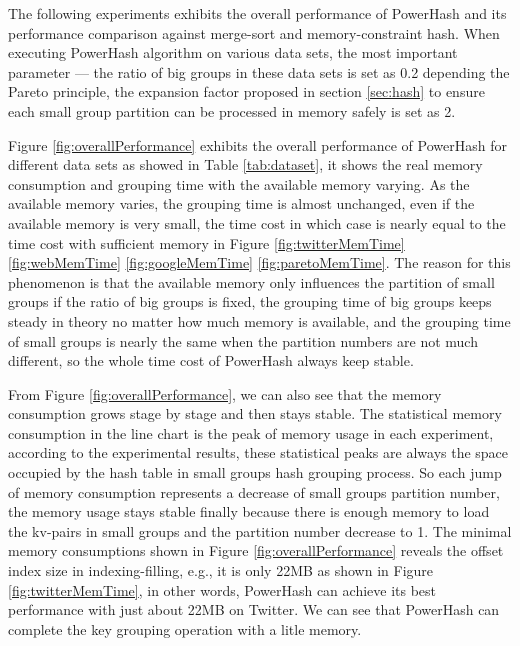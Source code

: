 The following experiments exhibits the overall performance of PowerHash and its performance comparison against merge-sort and memory-constraint hash. When executing PowerHash algorithm on various data sets, the most important parameter --- the ratio of big groups in these data sets is set as 0.2 depending the Pareto principle, the expansion factor proposed in section \ref{sec:hash} to ensure each small group partition can be processed in memory safely is set as 2. 

Figure \ref{fig:overallPerformance} exhibits the overall performance of PowerHash for different data sets as showed in Table \ref{tab:dataset}, it shows the real memory consumption and grouping time with the available memory varying. As the available memory varies, the grouping time is almost unchanged, even if the available memory is very small, the time cost in which case is nearly equal to the time cost with sufficient memory in Figure \ref{fig:twitterMemTime} \ref{fig:webMemTime} \ref{fig:googleMemTime} \ref{fig:paretoMemTime}. The reason for this phenomenon is that the available memory only influences the partition of small groups if the ratio of big groups is fixed, the grouping time of big groups keeps steady in theory no matter how much memory is available, and the grouping time of small groups is nearly the same when the partition numbers are not much different, so the whole time cost of PowerHash always keep stable. 

From Figure \ref{fig:overallPerformance}, we can also see that the memory consumption grows stage by stage and then stays stable. The statistical memory consumption in the line chart is the peak of memory usage in each experiment, according to the experimental results, these statistical peaks are always the space occupied by the hash table in small groups hash grouping process. So each jump of memory consumption represents a decrease of small groups partition number, the memory usage stays stable finally because there is enough memory to load the kv-pairs in small groups and the partition number decrease to 1. The minimal memory consumptions shown in Figure \ref{fig:overallPerformance} reveals the offset index size in indexing-filling, e.g., it is only 22MB as shown in Figure \ref{fig:twitterMemTime}, in other words, PowerHash can achieve its best performance with just about 22MB on Twitter. We can see that PowerHash can complete the key grouping operation with a litle memory.
 
